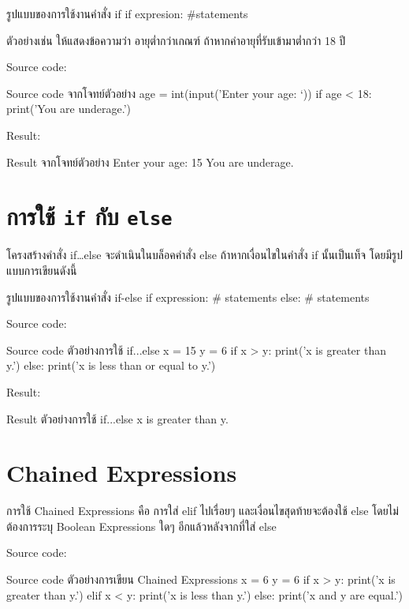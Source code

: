 \begin{codelist}{รูปแบบของการใช้งานคำสั่ง if}{}
if expresion:
    #statements
\end{codelist}

ตัวอย่างเช่น ให้แสดงข้อความว่า อายุต่ำกว่าเกณฑ์ ถ้าหากค่าอายุที่รับเข้ามาต่ำกว่า 18 ปี

Source code:
\begin{codelist}{Source code จากโจทย์ตัวอย่าง}{}
age = int(input('Enter your age: `))
if age < 18:
   print('You are underage.')
\end{codelist}

Result:
\begin{codelist}{Result จากโจทย์ตัวอย่าง}{}
Enter your age: 15
You are underage.
\end{codelist}


\section{การใช้ \texttt{if} กับ \texttt{else}}

โครงสร้างคำสั่ง if…else จะดำเนินในบล็อคคำสั่ง else ถ้าหากเงื่อนไขในคำสั่ง if นั้นเป็นเท็จ โดยมีรูปแบบการเขียนดังนี้

\begin{codelist}{รูปแบบของการใช้งานคำสั่ง if-else}{}
if expression:
    # statements
else:
    # statements
\end{codelist}

Source code:
\begin{codelist}{Source code ตัวอย่างการใช้ if...else}{}
x = 15
y = 6
if x > y: print('x is greater than y.')
else: print('x is less than or equal to y.')
\end{codelist}

Result:
\begin{codelist}{Result ตัวอย่างการใช้ if...else}{}
x is greater than y.
\end{codelist}


\section{Chained Expressions}

การใช้ Chained Expressions คือ การใส่ elif ไปเรื่อยๆ และเงื่อนไขสุดท้ายจะต้องใช้ else โดยไม่ต้องการระบุ Boolean Expressions ใดๆ อีกแล้วหลังจากที่ใส่ else

Source code:
\begin{codelist}{Source code ตัวอย่างการเขียน Chained Expressions}{}
x = 6
y = 6
if x > y: print('x is greater than y.')
elif x < y: print('x is less than y.')
else: print('x and y are equal.')
\end{codelist}

